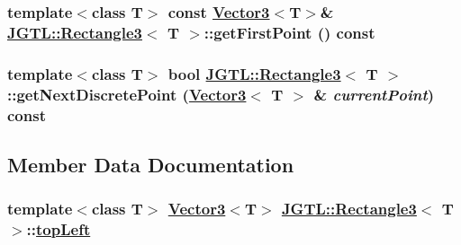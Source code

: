 \hypertarget{class_j_g_t_l_1_1_rectangle3_66013d1d9cd1a51a4e1a9a2708098a6e}{
\subsubsection[getFirstPoint]{\setlength{\rightskip}{0pt plus 5cm}template$<$class T$>$ const \hyperlink{class_j_g_t_l_1_1_vector3}{Vector3}$<$T$>$\& \hyperlink{class_j_g_t_l_1_1_rectangle3}{JGTL::Rectangle3}$<$ T $>$::get\-First\-Point () const}}
\label{class_j_g_t_l_1_1_rectangle3_66013d1d9cd1a51a4e1a9a2708098a6e}


\hypertarget{class_j_g_t_l_1_1_rectangle3_83b4f2996e51b68f6a14b0c1f1c35595}{
\subsubsection[getNextDiscretePoint]{\setlength{\rightskip}{0pt plus 5cm}template$<$class T$>$ bool \hyperlink{class_j_g_t_l_1_1_rectangle3}{JGTL::Rectangle3}$<$ T $>$::get\-Next\-Discrete\-Point (\hyperlink{class_j_g_t_l_1_1_vector3}{Vector3}$<$ T $>$ \& {\em current\-Point}) const}}
\label{class_j_g_t_l_1_1_rectangle3_83b4f2996e51b68f6a14b0c1f1c35595}




\subsection{Member Data Documentation}
\hypertarget{class_j_g_t_l_1_1_rectangle3_9970035e43da1a163aa13b8bba5c1193}{
\subsubsection[topLeft]{\setlength{\rightskip}{0pt plus 5cm}template$<$class T$>$ \hyperlink{class_j_g_t_l_1_1_vector3}{Vector3}$<$T$>$ \hyperlink{class_j_g_t_l_1_1_rectangle3}{JGTL::Rectangle3}$<$ T $>$::\hyperlink{class_j_g_t_l_1_1_rectangle3_9970035e43da1a163aa13b8bba5c1193}{top\-Left}}}
\label{class_j_g_t_l_1_1_rectangle3_9970035e43da1a163aa13b8bba5c1193}


